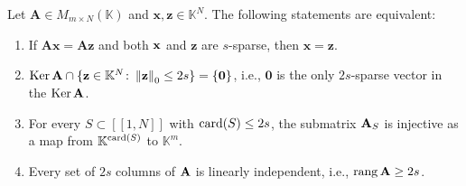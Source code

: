 \begin{theorem}
    Let $\mathbf{A} \in M_{m \times N}(\mathbb{K})$  and $\mathbf{x}, \mathbf{z} \in \mathbb{K}^N$.
    The following statements are equivalent:

    \begin{enumerate}[label=(\roman*)]
        \item \label{itm:itm1} If $\mathbf{Ax = Az}$ and both $\mathbf{x}$ and $\mathbf{z}$ are $s$-sparse, then $\mathbf{x = z}$.
        \item $\operatorname{Ker} \mathbf{A} \cap \{ \mathbf{z} \in \mathbb{K}^N \colon \left\Vert\mathbf{z}\right\Vert_0 \leq 2s \} = \{ \mathbf{0} \}$,
        i.e., $\mathbf{0}$ is the only $2s$-sparse vector in the $\operatorname{Ker} \mathbf{A}$.
        \item For every $S \subset [\![1,N]\!]$ with $\operatorname{card}(S) \leq 2s$, the submatrix $\mathbf{A}_S$ is injective as a
        map from $\mathbb{K}^{\operatorname{card}(S)}$ to $\mathbb{K}^m$.
        \item \label{itm:itm4} Every set of $2s$ columns of $\mathbf{A}$ is linearly independent, i.e., $\operatorname{rang} \mathbf{A} \geq 2s$.
    \end{enumerate}
\end{theorem}


